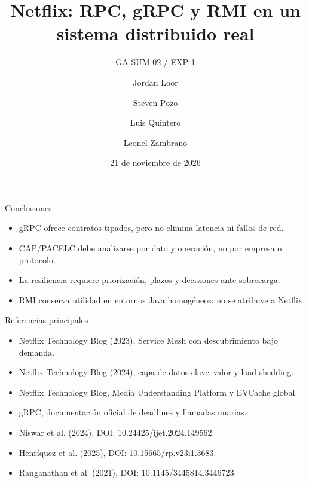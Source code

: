 \documentclass[aspectratio=169,10pt]{beamer}
\title{Netflix: RPC, gRPC y RMI en un sistema distribuido real}
\subtitle{GA-SUM-02 / EXP-1}
\author{Jordan Loor \and Steven Pozo \and Luis Quintero \and Leonel Zambrano}
\institute{UTEQ -- Aplicaciones Distribuidas}
\date{21 de noviembre de 2026}
\begin{document}
\begin{frame}\titlepage\end{frame}




\LeonelComunicacion
\LeonelFallos
\LeonelCierre
\begin{frame}{Conclusiones}
\begin{itemize}
\item gRPC ofrece contratos tipados, pero no elimina latencia ni fallos de red.
\item CAP/PACELC debe analizarse por dato y operación, no por empresa o protocolo.
\item La resiliencia requiere priorización, plazos y decisiones ante sobrecarga.
\item RMI conserva utilidad en entornos Java homogéneos; no se atribuye a Netflix.
\end{itemize}
\end{frame}
\begin{frame}{Referencias principales}
\tiny
\begin{itemize}
\item Netflix Technology Blog (2023), Service Mesh con descubrimiento bajo demanda.
\item Netflix Technology Blog (2024), capa de datos clave--valor y load shedding.
\item Netflix Technology Blog, Media Understanding Platform y EVCache global.
\item gRPC, documentación oficial de deadlines y llamadas unarias.
\item Niswar et al. (2024), DOI: 10.24425/ijet.2024.149562.
\item Henríquez et al. (2025), DOI: 10.15665/rp.v23i1.3683.
\item Ranganathan et al. (2021), DOI: 10.1145/3445814.3446723.
\end{itemize}
\end{frame}
\end{document}
